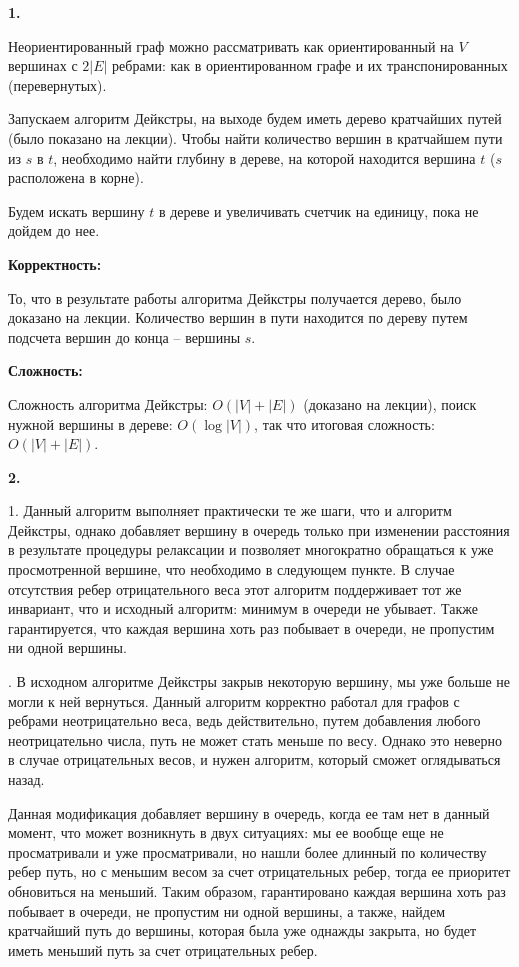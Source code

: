 \documentclass[12pt]{extreport}
\begin{document}
{\bf 1.} 

Неориентированный граф можно рассматривать как ориентированный на $V$ вершинах с $2|E|$ ребрами: как в ориентированном графе и их транспонированных (перевернутых). 

Запускаем алгоритм Дейкстры, на выходе будем иметь дерево кратчайших путей (было показано на лекции). Чтобы найти количество вершин в кратчайшем пути из $s$ в $t$, необходимо найти глубину в дереве, на которой находится вершина $t$ ($s$ расположена в корне). 

Будем искать вершину $t$ в дереве и увеличивать счетчик на единицу, пока не дойдем до нее. 

\bigskip 
{\bf Корректность:}

То, что в результате работы алгоритма Дейкстры получается дерево, было доказано на лекции. Количество вершин в пути находится по дереву путем подсчета вершин до конца -- вершины $s$.

\bigskip 
{\bf Сложность:} 

Сложность алгоритма Дейкстры: $O(|V|+|E|)$ (доказано на лекции), поиск нужной вершины в дереве: $O(\log|V|)$, так что итоговая сложность: $O(|V|+|E|)$.

\bigskip 
{\bf 2.} 

1. Данный алгоритм выполняет практически те же шаги, что и алгоритм Дейкстры, однако добавляет вершину в очередь только при изменении расстояния в результате процедуры релаксации и позволяет многократно обращаться к уже просмотренной вершине, что необходимо в следующем пункте. В случае отсутствия ребер отрицательного веса этот алгоритм поддерживает тот же инвариант, что и исходный алгоритм: минимум в очереди не убывает. Также гарантируется, что каждая вершина хоть раз побывает в очереди, не пропустим ни одной вершины.

. В исходном алгоритме Дейкстры закрыв некоторую вершину, мы уже больше не могли к ней вернуться. Данный алгоритм корректно работал для графов с ребрами неотрицательно веса, ведь действительно, путем добавления любого неотрицательно числа, путь не может стать меньше по весу. Однако это неверно в случае отрицательных весов, и нужен алгоритм, который сможет оглядываться назад. 

Данная модификация добавляет вершину в очередь, когда ее там нет в данный момент, что может возникнуть в двух ситуациях: мы ее вообще еще не просматривали и уже просматривали, но нашли более длинный по количеству ребер путь, но с меньшим весом за счет отрицательных ребер, тогда ее приоритет обновиться на меньший. Таким образом, гарантировано каждая вершина хоть раз побывает в очереди, не пропустим ни одной вершины, а также, найдем кратчайший путь до вершины, которая была уже однажды закрыта, но будет иметь меньший путь за счет отрицательных ребер. 
\end{document}
